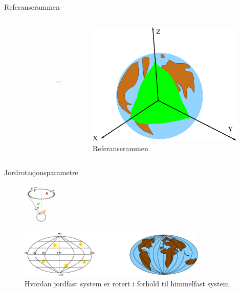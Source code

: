 \documentclass[12pt,table,t]{beamer}
\begin{document}
\begin{frame}{Referanserammen}
\begin{columns}
\begin{figure}
      \end{figure}
    \\ \ \\ \ \\ \ \\ \ \\
      =
      \\ \ \\ 
      \begin{figure}
        \includegraphics[width=0.97\textwidth]{figure/referanseramme.eps}\caption{Referanserammen}
      \end{figure}
  \end{columns}
\end{frame}


\begin{frame}{Jordrotasjonsparametre}
  \begin{center}
    \begin{figure}
      \includegraphics[width=0.15\textwidth]{figure/eop_parameters.png}
    \end{figure}

  \begin{figure}
    \includegraphics[width=0.8\textwidth]{figure/eop.eps}\caption{Hvordan jordfast system er rotert i forhold til himmelfast system.}
  \end{figure}
  \end{center}
\end{frame}
\end{document}
